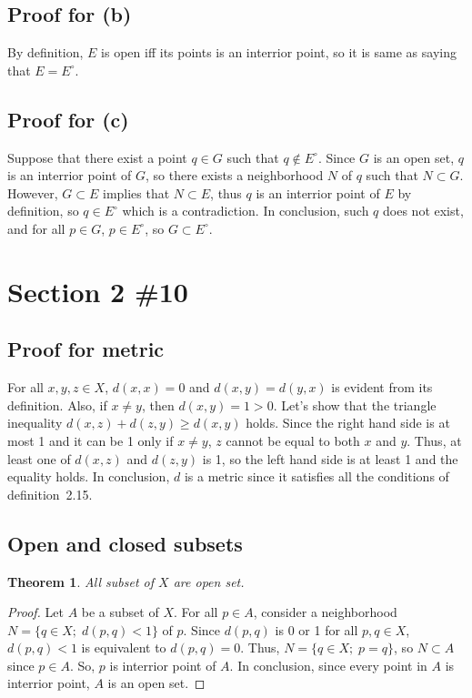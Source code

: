 \documentclass{scrartcl}
\newtheorem{theorem}{Theorem}
\begin{document}
\subsection{Proof for (b)}
By definition, \(E\) is open iff its points is an interrior point, so it is same as saying that \(E = E^\circ\).

\subsection{Proof for (c)}
Suppose that there exist a point \(q \in G\) such that \(q \not \in E^\circ\).
Since \(G\) is an open set, \(q\) is an interrior point of \(G\), so there exists a neighborhood \(N\) of \(q\) such that \(N \subset G\).
However, \(G \subset E\) implies that \(N \subset E\), thus \(q\) is an interrior point of \(E\) by definition, so \(q \in E^\circ\) which is a contradiction.
In conclusion, such \(q\) does not exist, and for all \(p \in G\), \(p \in E^\circ\), so \(G \subset E^\circ\).

\section{Section 2 \#10}
\subsection{Proof for metric}
For all \(x, y, z \in X\), \(d(x, x) = 0\) and \(d(x, y) = d(y, x)\) is evident from its definition.
Also, if \(x \not = y\), then \(d(x, y) = 1 > 0\).
Let's show that the triangle inequality \(d(x, z) + d(z, y) \geq d(x, y)\) holds.
Since the right hand side is at most 1 and it can be 1 only if \(x \not = y\), \(z\) cannot be equal to both \(x\) and \(y\).
Thus, at least one of \(d(x, z)\) and \(d(z, y)\) is 1, so the left hand side is at least 1 and the equality holds.
In conclusion, \(d\) is a metric since it satisfies all the conditions of definition~2.15.

\subsection{Open and closed subsets}
\begin{theorem}
  All subset of \(X\) are open set.
\end{theorem}
\begin{proof}
  Let \(A\) be a subset of \(X\).
  For all \(p \in A\), consider a neighborhood \(N = \{q \in X;\; d(p, q) < 1\}\) of \(p\).
  Since \(d(p, q)\) is 0 or 1 for all \(p, q \in X\), \(d(p, q) < 1\) is equivalent to \(d(p, q) = 0\).
  Thus, \(N = \{q \in X;\; p = q\}\), so \(N \subset A\) since \(p \in A\).
  So, \(p\) is interrior point of \(A\).
  In conclusion, since every point in \(A\) is interrior point, \(A\) is an open set.
\end{proof}
\end{document}
